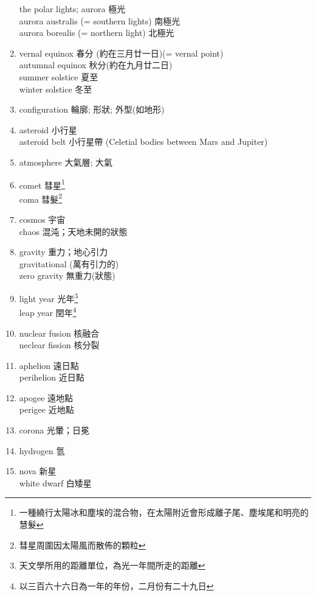 \documentclass[twoside,b5paper]{book}
\begin{document}
\begin{enumerate}
      the polar lights; aurora  極光\\
      aurora australis (= southern lights) 南極光\\
      aurora borealis (= northern light) 北極光
    \item
      vernal equinox 春分 (約在三月廿一日)(= vernal point)\\
      autumnal equinox  秋分(約在九月廿二日)\\
      summer solstice  夏至\\
      winter solstice 冬至
    \item
      configuration 輪廓; 形狀; 外型(如地形)
    \item
      asteroid  小行星\\
      asteroid belt 小行星帶 (Celetial bodies between Mars and Jupiter)
    \item
      atmosphere  大氣層; 大氣
    \item
      comet 彗星\footnote{一種繞行太陽冰和塵埃的混合物，在太陽附近會形成離子尾、塵埃尾和明亮的慧髮}\\
      coma  彗髮\footnote{彗星周圍因太陽風而散佈的顆粒}\\
    \item
      cosmos  宇宙\\
      chaos 混沌；天地未開的狀態
    \item
      gravity  重力；地心引力\\
      gravitational  (萬有引力的)\\
      zero gravity 無重力(狀態)
    \item
      light year 光年\footnote{天文學所用的距離單位，為光一年間所走的距離}\\
      leap year 閏年\footnote{以三百六十六日為一年的年份，二月份有二十九日}
    \item
      nuclear fusion 核融合\\
      neclear fission 核分裂
    \item
      aphelion  遠日點\\
      perihelion  近日點
    \item
      apogee  遠地點\\
      perigee  近地點
    \item
      corona  光暈；日冕
    \item
      hydrogen  氫
    \item
      nova 新星\\
      white dwarf 白矮星
  \end{enumerate}
\end{document}
